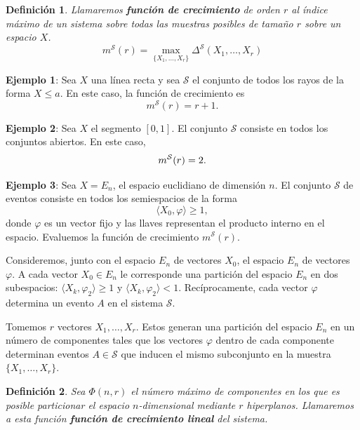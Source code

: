 \documentclass{report}
\newtheorem{dfn}{Definición}[subsection]
\begin{document}
\begin{dfn}
    Llamaremos \textbf{función de crecimiento} de orden $r$ al índice máximo de un sistema sobre todas las muestras
    posibles de tamaño $r$ sobre un espacio $X$. 
    \[
    m^{\mathcal{S}}(r) = \max_{\{X_1,\dots,X_r\}}\Delta^{\mathcal{S}}(X_1,\dots,X_r)
    \]
\end{dfn}
\bigskip

\textbf{Ejemplo 1}: Sea \( X \) una línea recta y sea \( \mathcal{S} \) el conjunto 
de todos los rayos de la forma \( X \leq a \). En este caso, la función de crecimiento es  
\[
m^{\mathcal{S}}(r) = r + 1.
\]

\textbf{Ejemplo 2}: Sea \( X \) el segmento \([0,1]\). El conjunto \( \mathcal{S} \) 
consiste en todos los conjuntos abiertos. En este caso,  
\[
m^{\mathcal{S}}(r) = 2.\newline
\]

\textbf{Ejemplo 3}: Sea \( X = E_n \), el espacio euclidiano de dimensión \( n \). 
El conjunto \( \mathcal{S} \) de eventos consiste en todos los semiespacios de la forma  
\[
\langle X_0, \varphi \rangle \geq 1,
\]  
donde \( \varphi \) es un vector fijo y las llaves representan el producto interno en el espacio.
 Evaluemos la función de crecimiento \( m^{\mathcal{S}}(r) \).\newline

Consideremos, junto con el espacio \( E_n \) de vectores \( X_0 \), el espacio \( E_n \) 
de vectores \( \varphi \). A cada vector \( X_0 \in E_n \) le corresponde una partición 
del espacio \( E_n \) en dos subespacios: \(\langle X_k, \varphi_2 \rangle \geq 1\) y \(\langle X_k, \varphi_2 \rangle < 1\). 
Recíprocamente, cada vector \(\varphi\) determina un evento $A$ en el sistema \(\mathcal{S}\).\newline

Tomemos \( r \) vectores \( X_1, \dots, X_r \). Estos generan una partición del espacio \( E_n \) 
en un número de componentes tales que los vectores \( \varphi \) dentro de cada componente determinan eventos 
\( A \in \mathcal{S} \) que inducen el mismo subconjunto en la muestra \( \{X_1, \dots, X_r \}\).\newline

\begin{dfn}
    Sea \( \Phi(n, r) \) el número máximo de componentes en los que es posible particionar el espacio \( n \)-dimensional 
mediante \( r \) hiperplanos. Llamaremos a esta función \textbf{función de crecimiento lineal} del sistema.
\end{dfn}
\end{document}
